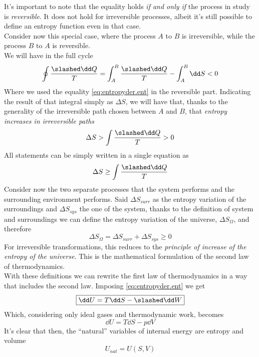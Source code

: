 \documentclass[../qm.tex]{subfiles}
\begin{document}
It's important to note that the equality \label{eq:entropyder.ent} holds \textit{if and only if} the process in study is \textit{reversible}. It does not hold for irreversible processes, albeit it's still possible to define an entropy function even in that case.\\
Consider now this special case, where the process $A$ to $B$ is irreversible, while the process $B$ to $A$ is reversible.\\
We will have in the full cycle
\begin{equation*}
	\oint\frac{\slashed\dd Q}{T}=\int_{A}^{B}\frac{\slashed\dd Q}{T}-\int_A^B\dd S<0
\end{equation*}
Where we used the equality \eqref{eq:entropyder.ent} in the reversible part. Indicating the result of that integral simply as $\Delta S$, we will have that, thanks to the generality of the irreversible path chosen between $A$ and $B$, that \textit{entropy increases in irreversible paths}
\begin{equation}
	\Delta S>\int\frac{\slashed\dd Q}{T}>0
	\label{eq:increaseofentropy.ent}
\end{equation}
All statements can be simply written in a single equation as
\begin{equation}
	\Delta S\ge\int\frac{\slashed\dd Q}{T}
	\label{eq:entropy.ent}
\end{equation}
Consider now the two separate processes that the system performs and the surrounding environment performs. Said $\Delta S_{surr}$ as the entropy variation of the surroundings and $\Delta S_{sys}$ the one of the system, thanks to the definition of system and surroundings we can define the entropy variation of the universe, $\Delta S_\Omega$, and therefore
\begin{equation}
	\boxed{\Delta S_{\Omega}=\Delta S_{surr}+\Delta S_{sys}\ge0}
	\label{eq:universeentinc.ent}
\end{equation}
For irreversible transformations, this reduces to the \textit{principle of increase of the entropy of the universe}. This is the mathematical formulation of the second law of thermodynamics.\\
With these definitions we can rewrite the first law of thermodynamics in a way that includes the second law. Imposing \eqref{eq:entropyder.ent} we get
\begin{equation}
	\boxed{\dd U = T\dd S - \slashed\dd W}
	\label{eq:1+2.2nd}
\end{equation}
Which, considering only ideal gases and thermodynamic work, becomes
\begin{equation}
	\boxed{\dd U = T\dd S - p\dd V}
	\label{eq:1+2ig.2nd}
\end{equation}
It's clear that then, the ``natural'' variables of internal energy are entropy and volume
\begin{equation*}
	U_{nat}=U(S, V)
\end{equation*}
\end{document}
